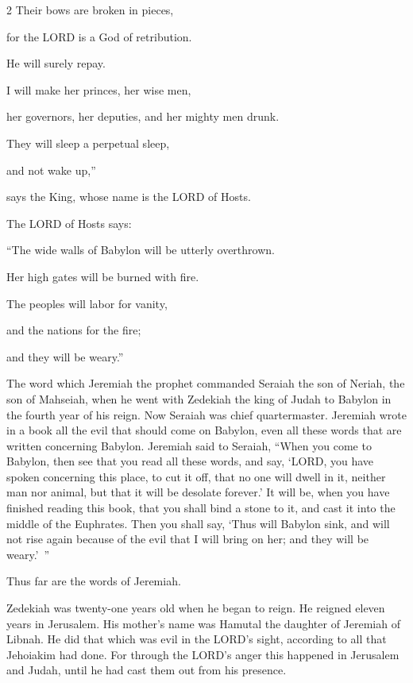 \begin{multicols}{2}
Their bows are broken in pieces,

for the LORD is a God of retribution.

He will surely repay.


\myverse{}I will make her princes, her wise men,

her governors, her deputies, and her mighty men drunk.

They will sleep a perpetual sleep,

and not wake up,”

says the King, whose name is the LORD of Hosts.


\myverse{}The LORD of Hosts says:

“The wide walls of Babylon will be utterly overthrown.

Her high gates will be burned with fire.

The peoples will labor for vanity,

and the nations for the fire;

and they will be weary.”

\end{multicols}

\myverse{}The word which Jeremiah the prophet commanded Seraiah the son of Neriah, the son of Mahseiah, when he went with Zedekiah the king of Judah to Babylon in the fourth year of his reign. Now Seraiah was chief quartermaster. \myverse{}Jeremiah wrote in a book all the evil that should come on Babylon, even all these words that are written concerning Babylon. \myverse{}Jeremiah said to Seraiah, “When you come to Babylon, then see that you read all these words, \myverse{}and say, ‘LORD, you have spoken concerning this place, to cut it off, that no one will dwell in it, neither man nor animal, but that it will be desolate forever.’ \myverse{}It will be, when you have finished reading this book, that you shall bind a stone to it, and cast it into the middle of the Euphrates. \myverse{}Then you shall say, ‘Thus will Babylon sink, and will not rise again because of the evil that I will bring on her; and they will be weary.’ ”

Thus far are the words of Jeremiah.

\mychapter{} \myverse*{}Zedekiah was twenty-one years old when he began to reign. He reigned eleven years in Jerusalem. His mother’s name was Hamutal the daughter of Jeremiah of Libnah. \myverse{}He did that which was evil in the LORD’s sight, according to all that Jehoiakim had done. \myverse{}For through the LORD’s anger this happened in Jerusalem and Judah, until he had cast them out from his presence.

